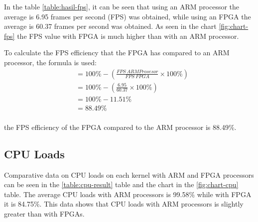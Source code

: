 
In the table \ref{table:hasil-fps}, it can be seen that using an ARM processor the average is 6.95 frames per second (FPS) was obtained, while using an FPGA the average is 60.37 frames per second was obtained. As seen in the chart \ref{fig:chart-fps} the FPS value with FPGA is much higher than with an ARM processor.


To calculate the FPS efficiency that the FPGA has compared to an ARM processor, the formula is used:
\begin{equation*}
    \begin{split}
& = 100\% - \left( \frac{FPS\ ARM Prosesor}{FPS\ FPGA} \times 100\% \right) \\
& = 100\% - \left( \frac{6.95}{60.37} \times 100\% \right) \\
& = 100\% - 11.51\% \\
& = 88.49\% \\
    \end{split}
\end{equation*}


the FPS efficiency of the FPGA compared to the ARM processor is 88.49\%.

\subsection{CPU Loads}


Comparative data on CPU loads on each kernel with ARM and FPGA processors can be seen in the \ref{table:cpu-result} table and the chart in the \ref{fig:chart-cpu} table. The average CPU loads with ARM processors is 99.58\% while with FPGA it is 84.75\%. This data shows that CPU loads with ARM processors is slightly greater than with FPGAs.

